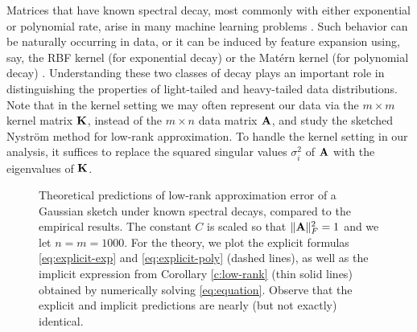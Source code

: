 \documentclass{article}
\begin{document}
Matrices that have known spectral decay, most commonly with either
exponential or polynomial rate, arise in many machine
learning problems \cite{randomized-newton}. Such behavior can be naturally
occurring in data, or it can be induced by feature expansion using, say, the
RBF kernel (for exponential decay) \cite{Santa97Gaussianregression} or the
Mat\'ern kernel (for polynomial decay) \cite{RasmussenWilliams06}. Understanding these
two classes of decay plays an important role in distinguishing the
properties of light-tailed and heavy-tailed data distributions.
Note that in the kernel setting we may often represent our data via
the $m\times m$ kernel matrix $\mathbf K$, instead of the $m\times n$ data
matrix $\mathbf A$, and study the sketched Nystr\"om method
\cite{revisiting-nystrom} for low-rank approximation. To handle 
the kernel setting in our analysis, it suffices to replace the squared singular
values $\sigma_i^2$ of $\mathbf A$ with the eigenvalues of $\mathbf K$.
\begin{figure}[t]
\centering
{}
\hfill
{}
\caption{
Theoretical predictions of low-rank approximation error of a Gaussian
sketch under known spectral decays, compared to the empirical results.
The constant $C$ is scaled so that $\|\mathbf A\|_F^2=1$ and we let
$n=m=1000$. For the theory, we plot the explicit formulas
\eqref{eq:explicit-exp} and \eqref{eq:explicit-poly} (dashed lines),
as well as the implicit expression from Corollary \ref{c:low-rank}
(thin solid lines) obtained by numerically solving
\eqref{eq:equation}. Observe that the explicit and implicit
predictions are nearly (but not exactly) identical.
}
\label{f:explicit}
\end{figure}
\end{document}

